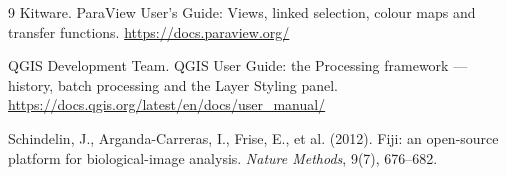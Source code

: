 \documentclass[11pt,a4paper]{article}
\begin{document}
\begin{thebibliography}{9}
Kitware. ParaView User's Guide: Views, linked selection, colour maps and
transfer functions. \url{https://docs.paraview.org/}

QGIS Development Team. QGIS User Guide: the Processing framework --- history,
batch processing and the Layer Styling panel.
\url{https://docs.qgis.org/latest/en/docs/user_manual/}

Schindelin, J., Arganda-Carreras, I., Frise, E., et al. (2012). Fiji: an
open-source platform for biological-image analysis. \emph{Nature Methods},
9(7), 676--682.

\end{thebibliography}
\end{document}
